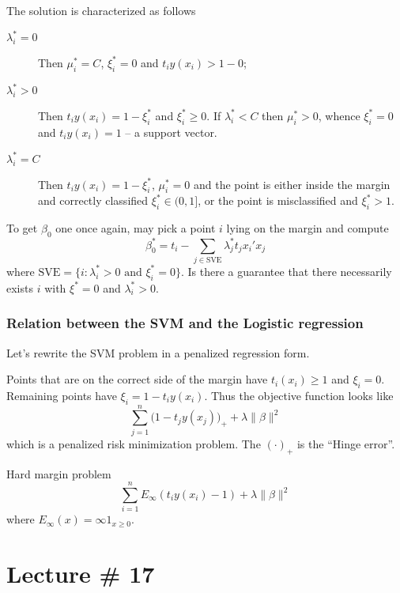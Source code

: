\documentclass[a4paper]{article}
\begin{document}
The solution is characterized as follows
\begin{description}
	\item[$\lambda^*_i = 0$] Then $\mu^*_i = C$, $\xi^*_i = 0$ and $t_i y(x_i) > 1-0$;
	\item[$\lambda^*_i > 0$] Then $t_i y(x_i) = 1 - \xi^*_i$ and $\xi^*_i \geq 0$.
	If $\lambda^*_i < C$ then $\mu^*_i > 0$, whence $\xi^*_i = 0$ and $t_i y(x_i) = 1$ -- a
	support vector.
	\item[$\lambda^*_i = C$] Then $t_i y(x_i) = 1 - \xi^*_i$, $\mu^*_i=0$ and the
	point is either inside the margin and correctly classified $\xi^*_i \in (0,1]$, or
	the point is misclassified and $\xi^*_i>1$.
\end{description}

To get $\beta_0$ one once again, may pick a point $i$ lying on the margin
and compute 
\[ \beta^*_0 = t_i - \sum_{j\in\text{SVE}} \lambda^*_j t_j x_i'x_j \]
where $\text{SVE} = \{i:\lambda^*_i > 0 \text{ and } \xi^*_i = 0\}$.
Is there a guarantee that there necessarily exists $i$ with $\xi^* = 0$ and
$\lambda^*_i>0$.


\subsubsection{Relation between the SVM and the Logistic regression} %
\label{ssub:relation_between_the_svm_and_the_logistic_regression}

Let's rewrite the SVM problem in a penalized regression form.

Points that are on the correct side of the margin have $t_i (x_i) \geq 1$ and $\xi_i = 0$.
Remaining points have $\xi_i = 1-t_i y(x_i)$. Thus the objective function looks
like
\[ \sum_{j=1}^n \bigl(1-t_j y(x_j)\bigr)_+ + \lambda \|\beta\|^2 \]
which is a penalized risk minimization problem. The $(\cdot)_+$ is the ``Hinge error''.

Hard margin problem
\[ \sum_{i=1}^n E_\infty(t_i y(x_i) - 1 ) + \lambda \|\beta\|^2\]
where $E_\infty(x) = \infty 1_{x\geq 0}$.




\section{Lecture \# 17} %
\label{sec:lecture_17}
\end{document}
